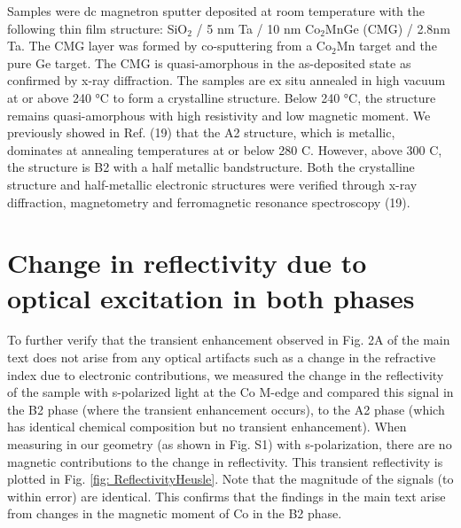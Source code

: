 Samples were dc magnetron sputter deposited at room temperature with the following thin film structure: SiO$_2$ / 5 nm Ta / 10 nm Co$_2$MnGe (CMG) / 2.8nm Ta. The CMG layer was formed by co-sputtering from a Co$_2$Mn target and the pure Ge target. The CMG is quasi-amorphous in the as-deposited state as confirmed by x-ray diffraction.  The samples are ex situ annealed in high vacuum at or above 240 °C to form a crystalline structure. Below 240 °C, the structure remains quasi-amorphous with high resistivity and low magnetic moment. We previously showed in Ref. (19) that the A2 structure, which is metallic, dominates at annealing temperatures at or below 280 C. However, above 300 C, the structure is B2 with a half metallic bandstructure.  Both the crystalline structure and half-metallic electronic structures were verified through x-ray diffraction, magnetometry and ferromagnetic resonance spectroscopy (19).

\section{Change in reflectivity due to optical excitation in both phases} 
To further verify that the transient enhancement observed in Fig. 2A of the main text does not arise from any optical artifacts such as a change in the refractive index due to electronic contributions, we measured the change in the reflectivity of the sample with s-polarized light at the Co M-edge and compared this signal in the B2 phase (where the transient enhancement occurs), to the A2 phase (which has identical chemical composition but no transient enhancement). When measuring in our geometry (as shown in Fig. S1) with s-polarization, there are no magnetic contributions to the change in reflectivity. This transient reflectivity is plotted in Fig. \ref{fig: ReflectivityHeusle}. Note that the magnitude of the signals (to within error) are identical. This confirms that the findings in the main text arise from changes in the magnetic moment of Co in the B2 phase.

